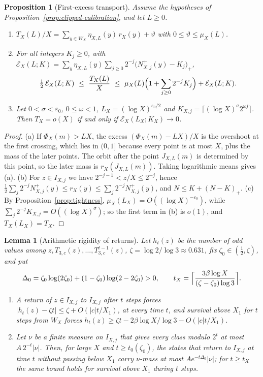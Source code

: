 \documentclass[12pt]{amsart}
\newtheorem{lemma}{Lemma}
\newtheorem{proposition}{Proposition}
\theoremstyle{definition}
\theoremstyle{remark}
\begin{document}
\begin{proposition}[First-excess transport]
\label{prop:first-excess}
Assume the hypotheses of Proposition~\ref{prop:clipped-calibration}, and let $L\ge0$.
\begin{enumerate}[label=(\alph*)]
 \item $T_X(L)/X=\sum_{y\in W_X}\eta_{X,L}(y)\,r_X(y)+\vartheta$ with $0\le\vartheta\le\mu_X(L)$.
 \item For all integers $K_j\ge0$, with $\mathcal E_X(L;K)=\sum_{y}\eta_{X,L}(y)\sum_{j\ge0}2^{-j}\bigl(N^+_{X,j}(y)-K_j\bigr)_+$,
 \[
  \tfrac12\,\mathcal E_X(L;K)\ \le\ \frac{T_X(L)}X\ \le\ \mu_X(L)\Bigl(1+\sum_{j\ge0}2^{-j}K_j\Bigr)+\mathcal E_X(L;K).
 \]
 \item Let $0<\sigma<\varepsilon_0$, $0\le\omega<1$, $L_X=(\log X)^{\varepsilon_0/2}$ and $K_{X,j}=\lceil(\log X)^\sigma2^{\omega j}\rceil$. Then $T_X=o(X)$ if and only if $\mathcal E_X(L_X;K_X)\to0$.
\end{enumerate}
\end{proposition}

\begin{proof}
(a) If $\Phi_X(m)>LX$, the excess $(\Phi_X(m)-LX)/X$ is the overshoot at the first crossing, which lies in $(0,1]$ because every point is at most $X$, plus the mass of the later points. The orbit after the point $J_{X,L}(m)$ is determined by this point, so the later mass is $r_X(J_{X,L}(m))$. Taking logarithmic means gives (a). (b) For $z\in I_{X,j}$ we have $2^{-j-1}<z/X\le2^{-j}$, hence $\frac12\sum_j2^{-j}N^+_{X,j}(y)\le r_X(y)\le\sum_j2^{-j}N^+_{X,j}(y)$, and $N\le K+(N-K)_+$. (c) By Proposition~\ref{prop:tightness}, $\mu_X(L_X)=O((\log X)^{-\varepsilon_0})$, while $\sum_j2^{-j}K_{X,j}=O((\log X)^\sigma)$; so the first term in (b) is $o(1)$, and $T_X(L_X)=T_X$.
\end{proof}

\begin{lemma}[Arithmetic rigidity of returns]
\label{rem:rigidity}
Let $h_t(z)$ be the number of odd values among $z,T_{3,c}(z),\dots,T_{3,c}^{t-1}(z)$, $\zeta=\log2/\log3\approx0.631$, fix $\zeta_0\in(\frac12,\zeta)$, and put
\[
 \Delta_0=\zeta_0\log(2\zeta_0)+(1-\zeta_0)\log(2-2\zeta_0)>0,\qquad t_X=\Bigl\lceil\frac{3\beta\log X}{(\zeta-\zeta_0)\log3}\Bigr\rceil.
\]
\begin{enumerate}[label=(\alph*)]
 \item A return of $z\in I_{X,j}$ to $I_{X,j}$ after $t$ steps forces $|h_t(z)-\zeta t|\le\zeta+O(|c|t/X_1)$, at every time $t$, and survival above $X_1$ for $t$ steps from $W_X$ forces $h_t(z)\ge\zeta t-2\beta\log X/\log3-O(|c|t/X_1)$.
 \item Let $\nu$ be a finite measure on $I_{X,j}$ that gives every class modulo $2^t$ at most $A\,2^{-t}|\nu|$. Then, for large $X$ and $t\ge t_0(\zeta_0)$, the states that return to $I_{X,j}$ at time $t$ without passing below $X_1$ carry $\nu$-mass at most $Ae^{-t\Delta_0}|\nu|$; for $t\ge t_X$ the same bound holds for survival above $X_1$ during $t$ steps.
\end{enumerate}
\end{lemma}
\end{document}

